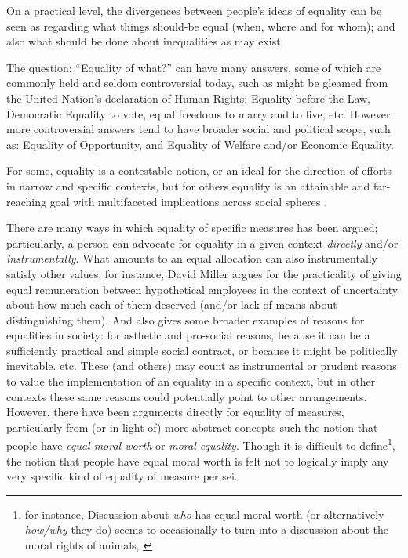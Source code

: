
On a practical level, the divergences between people's ideas of equality can be seen as regarding what things should-be equal (when, where and for whom); and also what should be done about inequalities as may exist.

The question: ``Equality of what?'' can have many answers, some of which are commonly held and seldom controversial today, such as might be gleamed from the United Nation's declaration of Human Rights: Equality before the Law, Democratic Equality to vote, equal freedoms to marry and to live, etc.
However more controversial answers tend to have broader social and political scope, such as: Equality of Opportunity, and Equality of Welfare and/or Economic Equality.%

For some, equality is a contestable notion, or an ideal for the direction of efforts in narrow and specific contexts, but for others equality is an attainable and far-reaching goal with multifaceted implications across social spheres \cite{walzer2008spheres,millerandwalzer,baker1992arguing}.

There are many ways in which equality of specific measures has been argued; particularly, a person can advocate for equality in a given context \textit{directly} and/or \textit{instrumentally}.
What amounts to an equal allocation can also instrumentally satisfy other values, for instance, David Miller \cite{equalityandjustice:1998} argues for the practicality of giving equal remuneration between hypothetical employees in the context of uncertainty about how much each of them deserved (and/or lack of means about distinguishing them). And also gives some broader examples of reasons for equalities in society: for asthetic and pro-social reasons, because it can be a sufficiently practical and simple social contract, or because it might be politically inevitable. etc.
These (and others) may count as instrumental or prudent reasons to value the implementation of an equality in a specific context, but in other contexts these same reasons could potentially point to other arrangements.
However, there have been arguments directly for equality of measures, particularly from (or in light of) more abstract concepts such the notion that people have \textit{equal moral worth} \cite{doallpersonshaveequalmoralworth} or \textit{moral equality}. Though it is difficult to define\footnote{for instance, Discussion about \textit{who} has equal moral worth (or alternatively \textit{how/why} they do) seems to occasionally to turn into a discussion about the moral rights of animals, \cite{doallpersonshaveequalmoralworth}}, the notion that people have equal moral worth is felt not to logically imply any very specific kind of equality of measure per sei.

